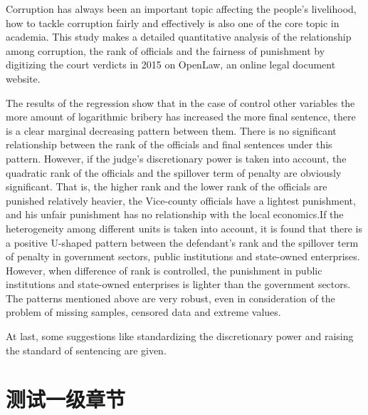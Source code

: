 \documentclass{SUIBEthesis}
\begin{document}
\newpage
\begin{enabstract}
  Corruption has always been an important topic affecting the people's livelihood, how to tackle corruption fairly and effectively is also one of the core topic in academia. This study makes a detailed quantitative analysis of the relationship among corruption, the rank of officials and the fairness of punishment by digitizing the court verdicts in 2015 on OpenLaw, an online legal document website.

  
The results of the regression show that in the case of control other variables the more amount of logarithmic bribery has increased the more final sentence, there is a clear marginal decreasing pattern between them. There is no significant relationship between the rank of the officials and final sentences under this pattern. However, if the judge's discretionary power is taken into account, the quadratic rank of the officials and the spillover term of penalty are obviously significant. That is, the higher rank and the lower rank of the officials are punished relatively heavier, the Vice-county officials have a lightest punishment, and his unfair punishment has no relationship with the local economics.If the heterogeneity among different units is taken into account, it is found that there is a positive U-shaped pattern between the defendant's rank and the spillover term of penalty in government sectors, public institutions and state-owned enterprises. However, when difference of rank is controlled, the punishment in public institutions and state-owned enterprises is lighter than the government sectors. The patterns mentioned above are very robust, even in consideration of the problem of missing samples, censored data and extreme values.


At last, some suggestions like standardizing the discretionary power and raising the standard of sentencing are given.

\end{enabstract}



\newpage
\pagestyle{empty}
\tableofcontents
\pagestyle{empty}
\thispagestyle{coverpage}


\newpage
\setcounter{page}{1}
\pagestyle{mainpage}





\section{测试一级章节}
\end{document}
